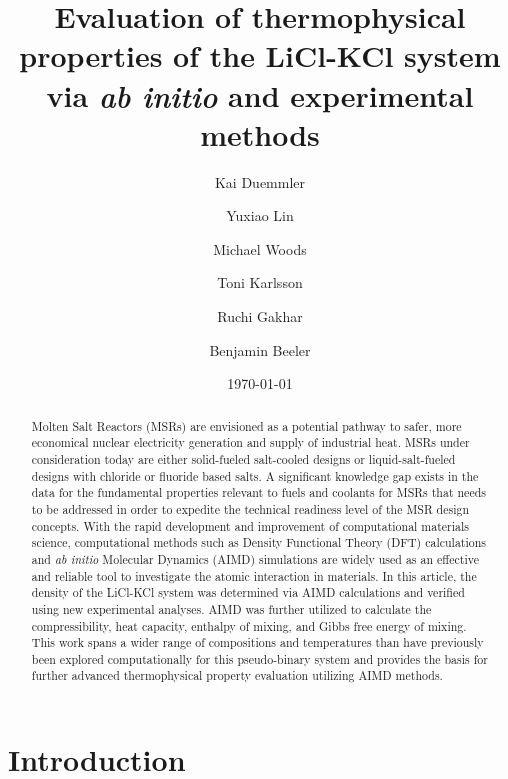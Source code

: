 \documentclass[review]{elsarticle}
\begin{document}
\begin{frontmatter}

\title{Evaluation of thermophysical properties of the LiCl-KCl system via \textit{ab initio} and experimental methods}

\author[ncsu]{Kai Duemmler}
\author[inl]{Yuxiao Lin}
\author[inl]{Michael Woods}
\author[inl]{Toni Karlsson}
\author[inl]{Ruchi Gakhar}
\author[ncsu,inl]{Benjamin Beeler}

\address[ncsu]{North Carolina State University, Raleigh, NC 27695}
\address[inl]{Idaho National Laboratory, Idaho Falls, ID 83415}
\date{\today}

\begin{abstract}
Molten Salt Reactors (MSRs) are envisioned as a potential pathway to safer, more economical nuclear electricity generation and supply of industrial heat. MSRs under consideration today are either solid-fueled salt-cooled designs or liquid-salt-fueled designs with chloride or fluoride based salts. A significant knowledge gap exists in the data for the fundamental properties relevant to fuels and coolants for MSRs that needs to be addressed in order to expedite the technical readiness level of the MSR design concepts. With the rapid development and improvement of computational materials science, computational methods such as Density Functional Theory (DFT) calculations and \textit{ab initio} Molecular Dynamics (AIMD) simulations are widely used as an effective and reliable tool to investigate the atomic interaction in materials. In this article, the density of the LiCl-KCl system was determined via AIMD calculations and verified using new experimental analyses. AIMD was further utilized to calculate the compressibility, heat capacity, enthalpy of mixing, and Gibbs free energy of mixing. This work spans a wider range of compositions and temperatures than have previously been explored computationally for this pseudo-binary system and provides the basis for further advanced thermophysical property evaluation utilizing AIMD methods.
\end{abstract}

\end{frontmatter}


\section{Introduction}
\end{document}
